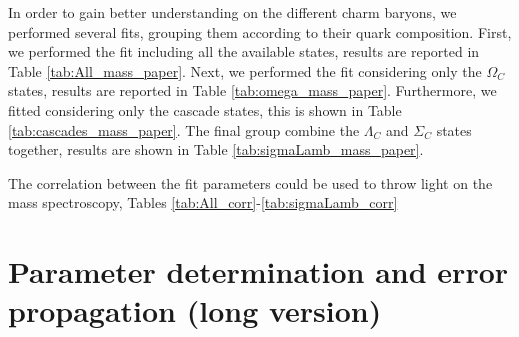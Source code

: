 \documentclass{article}
\begin{document}
In order to gain better understanding on the different charm baryons, we performed several fits, grouping them according to their quark composition. First, we performed the fit including all the available states,  results are reported in Table \ref{tab:All_mass_paper}.  Next, we performed the fit considering only the $\Omega_{C}$ states,  results are reported in Table \ref{tab:omega_mass_paper}.  Furthermore, we fitted considering only the cascade states, this is shown in Table \ref{tab:cascades_mass_paper}.  The final group combine the $\Lambda_{C}$ and $\Sigma_{C}$ states together, results are shown in Table \ref{tab:sigmaLamb_mass_paper}.

\begin{table}[h!]

\end{table}

\begin{table}[h!]

\end{table}

\begin{table}[h!]

\end{table}

\begin{table}[h!]

\end{table}


The correlation between the fit parameters could be used to throw light on the mass spectroscopy, Tables \ref{tab:All_corr}-\ref{tab:sigmaLamb_corr}

\begin{table}[h!]

\end{table}

\begin{table}[h!]

\end{table}

\begin{table}[h!]

\end{table}

\begin{table}[h!]

\end{table}

\section*{Parameter determination and error propagation (long version)}
\end{document}
